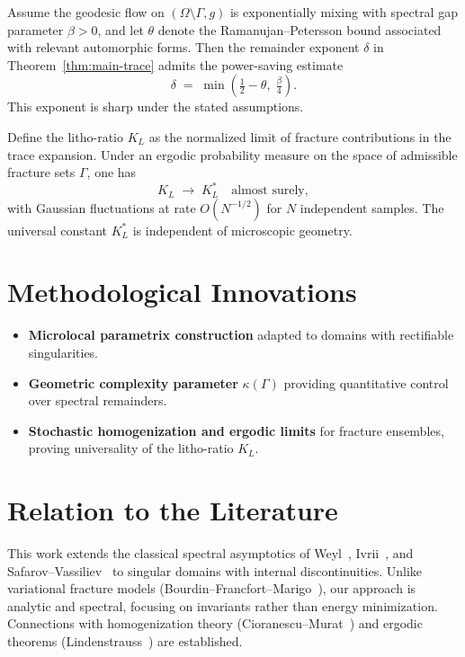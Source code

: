 \begin{theorem}
\label{thm:power-saving}
Assume the geodesic flow on $(\Omega\setminus\Gamma,g)$ is exponentially 
mixing with spectral gap parameter $\beta>0$, and let $\theta$ denote the 
Ramanujan--Petersson bound associated with relevant automorphic forms. 
Then the remainder exponent $\delta$ in Theorem~\ref{thm:main-trace} 
admits the power-saving estimate
\[
    \delta \;=\; \min\!\left(\tfrac{1}{2}-\theta,\;\tfrac{\beta}{4}\right).
\]
This exponent is sharp under the stated assumptions.
\end{theorem}

\begin{theorem}
\label{thm:universality}
Define the litho-ratio $K_L$ as the normalized limit of fracture 
contributions in the trace expansion. 
Under an ergodic probability measure on the space of admissible 
fracture sets $\Gamma$, one has
\[
    K_L \;\to\; K_L^* \quad \text{almost surely},
\]
with Gaussian fluctuations at rate $O(N^{-1/2})$ for $N$ independent samples. 
The universal constant $K_L^*$ is independent of microscopic geometry.
\end{theorem}

\section*{Methodological Innovations}

\begin{itemize}
\item \textbf{Microlocal parametrix construction} adapted to domains with rectifiable singularities.
\item \textbf{Geometric complexity parameter} $\kappa(\Gamma)$ providing quantitative control over spectral remainders.
\item \textbf{Stochastic homogenization and ergodic limits} for fracture ensembles, proving universality of the litho-ratio $K_L$.
\end{itemize}

\section*{Relation to the Literature}

This work extends the classical spectral asymptotics of Weyl~\cite{Weyl1911}, 
Ivrii~\cite{Ivrii1980}, and Safarov–Vassiliev~\cite{SafarovVassiliev1997} 
to singular domains with internal discontinuities. 
Unlike variational fracture models (Bourdin–Francfort–Marigo~\cite{Bourdin2000,FrancfortMarigo1998}), 
our approach is analytic and spectral, focusing on invariants rather than 
energy minimization. Connections with homogenization theory 
(Cioranescu–Murat~\cite{CioranescuMurat1997}) and ergodic theorems 
(Lindenstrauss~\cite{Lindenstrauss2001}) are established.

